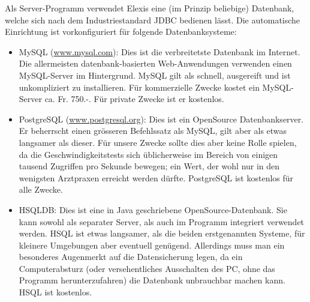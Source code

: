 Als Server-Programm verwendet Elexis eine (im Prinzip beliebige) Datenbank, welche sich nach dem
Industriestandard JDBC bedienen lässt. Die automatische Einrichtung ist vorkonfiguriert für folgende
Datenbanksysteme:
\begin{itemize}
\item MySQL (\href{http://www.mysql.com}{www.mysql.com}): Dies ist die verbreitetste Datenbank im Internet. Die allermeisten
datenbank-basierten
 Web-Anwendungen verwenden einen MySQL-Server im Hintergrund. MySQL gilt als schnell, ausgereift und ist
 unkompliziert zu installieren. Für kommerzielle Zwecke kostet ein MySQL-Server ca. Fr. 750.-. Für private
 Zwecke ist er kostenlos.

\item PostgreSQL (\href{http://www.postgresql.org}{www.postgresql.org}): Dies ist
ein OpenSource Datenbankserver. Er beherrscht einen grösseren Befehlssatz als MySQL,
 gilt aber als etwas langsamer als dieser. Für unsere Zwecke sollte dies aber keine Rolle spielen, da die
 Geschwindigkeitstests sich üblicherweise im Bereich von einigen tausend Zugriffen pro Sekunde bewegen;
 ein Wert, der wohl nur in den wenigsten Arztpraxen erreicht werden dürfte. PostgreSQL ist kostenlos für alle
 Zwecke.

\item HSQLDB: Dies ist eine in Java geschriebene OpenSource-Datenbank. Sie kann sowohl als separater Server, als auch 
im Programm integriert verwendet werden. HSQL ist etwas langsamer, als die beiden erstgenannten Systeme, für kleinere 
Umgebungen aber eventuell genügend. Allerdings muss man ein besonderes Augenmerkt auf die Datensicherung legen, da ein 
Computerabsturz (oder versehentliches Ausschalten des PC, ohne das Programm herunterzufahren) die Datenbank unbrauchbar 
machen kann. HSQL ist kostenlos.
\end{itemize}

